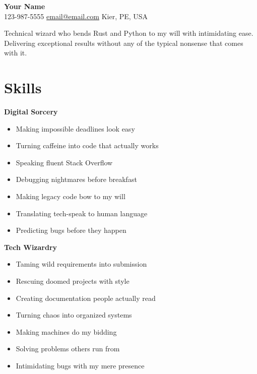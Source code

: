 \documentclass[11pt]{article}
\begin{document}
\begin{center}
	{\headingfont\Huge\textbf{Your Name}} \\
	123-987-5555 \textperiodcentered \href{mailto:email@email.com}{email@email.com} \textperiodcentered Kier, PE, USA
\end{center}

\begin{center}
\noindent Technical wizard who bends Rust and Python to my will with intimidating ease. Delivering exceptional results without any of the typical nonsense that comes with it.
\end{center}


\section*{\headingfont Skills}
\noindent
\begin{multicols}{2}
    \noindent
    \begin{minipage}[t]{\columnwidth}
        {\headingfont\textbf{Digital Sorcery}}
		\begin{itemize}[label=›, leftmargin=1em, noitemsep, topsep=0pt]
            \item Making impossible deadlines look easy
            \item Turning caffeine into code that actually works
            \item Speaking fluent Stack Overflow
            \item Debugging nightmares before breakfast
            \item Making legacy code bow to my will
            \item Translating tech-speak to human language
            \item Predicting bugs before they happen
        \end{itemize}
    \end{minipage}
    \columnbreak
    \noindent
    \begin{minipage}[t]{\columnwidth}
        {\headingfont\textbf{Tech Wizardry}}
		\begin{itemize}[label=›, leftmargin=1em, noitemsep, topsep=0pt]
            \item Taming wild requirements into submission
            \item Rescuing doomed projects with style
            \item Creating documentation people actually read
            \item Turning chaos into organized systems
            \item Making machines do my bidding
            \item Solving problems others run from
            \item Intimidating bugs with my mere presence
        \end{itemize}
    \end{minipage}
\end{multicols}
\end{document}
